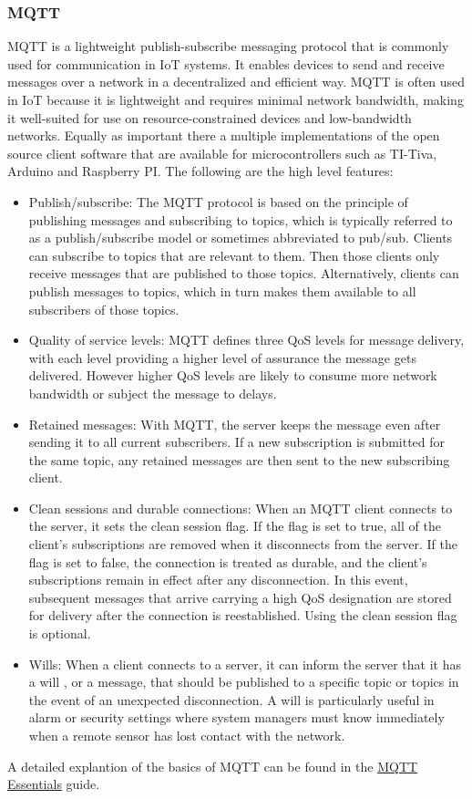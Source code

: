 \subsubsection{MQTT}
\ac{MQTT} is a lightweight publish-subscribe messaging protocol that is commonly used for communication in \ac{IoT} systems. It enables devices to send and receive messages over a network in a decentralized and efficient way. \ac{MQTT} is often used in \ac{IoT} because it is lightweight and requires minimal network bandwidth, making it well-suited for use on resource-constrained devices and low-bandwidth networks. Equally as important there a multiple implementations of the open source client software that are available for microcontrollers such as TI-Tiva, Arduino and Raspberry PI. The following are the high level features:
\begin{itemize}
\item Publish/subscribe: The \ac{MQTT} protocol is based on the principle of publishing messages and subscribing to topics, which is typically referred to as a publish/subscribe model or sometimes abbreviated to pub/sub. Clients can subscribe to topics that are relevant to them. Then those clients only receive messages that are published to those topics. Alternatively, clients can publish messages to topics, which in turn makes them available to all subscribers of those topics.
\item Quality of service levels: \ac{MQTT} defines three \ac{QoS} levels for message delivery, with each level providing a higher level of assurance the message gets delivered. However higher \ac{QoS} levels are likely to consume more network bandwidth or subject the message to delays.
\item Retained messages: With \ac{MQTT}, the server keeps the message even after sending it to all current subscribers. If a new subscription is submitted for the same topic, any retained messages are then sent to the new subscribing client.
\item Clean sessions and durable connections: When an \ac{MQTT} client connects to the server, it sets the clean session flag. If the flag is set to true, all of the client’s subscriptions are removed when it disconnects from the server. If the flag is set to false, the connection is treated as durable, and the client’s subscriptions remain in effect after any disconnection. In this event, subsequent messages that arrive carrying a high \ac{QoS} designation are stored for delivery after the connection is reestablished. Using the clean session flag is optional.
\item Wills: When a client connects to a server, it can inform the server that it has a will , or a message, that should be published to a specific topic or topics in the event of an unexpected disconnection. A will is particularly useful in alarm or security settings where system managers must know immediately when a remote sensor has lost contact with the network.
\end{itemize}
A detailed explantion of the basics of MQTT can be found in the \href{https://www.hivemq.com/mqtt-essentials/}{MQTT Essentials} guide.
